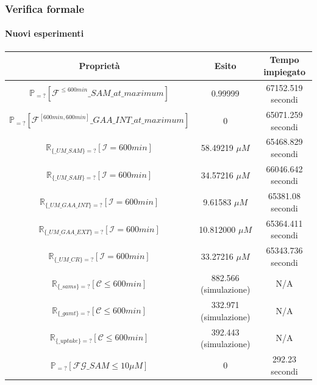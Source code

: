 \begin {frame}
\frametitle {Verifica formale}
\framesubtitle{Nuovi esperimenti}

\centering
\begin{tabular}{|c|c|c|}
	\hline
Propriet\`a & Esito & Tempo impiegato\\
\hline\hline
$\mathbb{P}_{=?} [ \mathcal{F}^{ \leq 600 min} \_SAM\_at\_maximum ]$ & 0.99999 & 67152.519 secondi\\
\hline
$\mathbb{P}_{=?} [ \mathcal{F}^{[600 min,600 min]} \_GAA\_INT\_at\_maximum ]$ & 0 & 65071.259 secondi \\
\hline
$\mathbb{R}_{\{\_UM\_SAM\}=?} [ \mathcal{I}=600 min ]$ & 58.49219 $\mu M$ & 65468.829 secondi \\
\hline
$\mathbb{R}_{\{\_UM\_SAH\}=?} [ \mathcal{I}=600 min ]$ & 34.57216 $\mu M$ & 66046.642 secondi \\
\hline
$\mathbb{R}_{\{\_UM\_GAA\_INT\}=?} [ \mathcal{I}=600 min ]$ & 9.61583 $\mu M$ & 65381.08 secondi \\
\hline
$\mathbb{R}_{\{\_UM\_GAA\_EXT\}=?} [ \mathcal{I}=600 min ]$ & 10.812000 $\mu M$ & 65364.411 secondi \\
\hline
$\mathbb{R}_{\{\_UM\_CR\}=?} [ \mathcal{I}=600 min ]$ & 33.27216 $\mu M$ & 65343.736 secondi \\
\hline
$\mathbb{R}_{\{\_sams\}=?} [ \mathcal{C} \leq 600 min ]$ & 882.566 (simulazione) & N/A \\
\hline
$\mathbb{R}_{\{\_gamt\}=?} [ \mathcal{C} \leq 600 min ]$ & 332.971 (simulazione) & N/A \\
\hline
$\mathbb{R}_{\{\_uptake\}=?} [ \mathcal{C} \leq 600 min ]$ & 392.443 (simulazione) & N/A\\
\hline
$\mathbb{P}_{=?} [\mathcal{F} \mathcal{G} \_SAM \leq 10 \mu M]$ & 0 & 292.23 secondi \\
\hline
\end{tabular}

\end{frame}